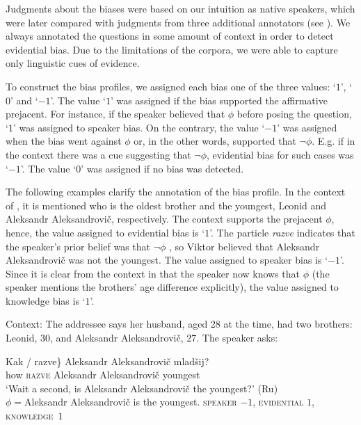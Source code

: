 \documentclass[output=paper,colorlinks,citecolor=brown]{langscibook}
\begin{document}
Judgments about the biases were based on our intuition as native speakers, which were later compared with judgments from three additional annotators (see ). We always annotated the questions in some amount of context in order to detect evidential bias. Due to the limitations of the corpora, we were able to capture only linguistic cues of evidence. 

To construct the bias profiles, we assigned each bias one of the three values: `$1$', `$0$' and `$-1$'. The value `$1$' was assigned if the bias supported the affirmative prejacent. For instance, if the speaker believed that $\phi$ before posing the question, `$1$' was assigned to speaker bias. On the contrary, the value `$-1$' was assigned when the bias went against $\phi$ or, in the other words, supported that $\neg \phi$. E.g. if in the context there was a cue suggesting that $\neg \phi$, evidential bias for such cases was `$-1$'. The value `$0$' was assigned if no bias was detected. 

The following examples clarify the annotation of the bias profile. In the context of , it is mentioned who is the oldest brother and the youngest, Leonid and Aleksandr Aleksandrovič, respectively. The context supports the prejacent $\phi$, hence, the value assigned to evidential bias is `$1$'. The particle \textit{razve} indicates that the speaker's prior belief was that $\neg \phi$ \citep{Geist2023, Korotkova2023}, so Viktor believed that Aleksandr Aleksandrovič was not the youngest. The value assigned to speaker bias is `$-1$'. Since it is clear from the context in  that the speaker now knows that $\phi$ (the speaker mentions the brothers' age difference explicitly), the value assigned to knowledge bias is `$1$'.

\largerpage
\begin{exe}
\ex Context: The addressee says her husband, aged 28 at the time, had two brothers: Leonid, 30, and Aleksandr Aleksandrovič, 27. The speaker asks:
    \begin{xlist}
     \gll \minsp{\{} Kak / razve\} Aleksandr Aleksandrovič mladšij? \\
    {} how {} \textsc{razve} Aleksandr Aleksandrovič youngest \\
    \glt `Wait a second, is Aleksandr Aleksandrovič the youngest?' \hfill (Ru)\\
    $\phi={}$Aleksandr Aleksandrovič is the youngest. 
    \label{ex-rubiases}
     \textsc{speaker} $-1$, \textsc{evidential} $1$, \textsc{knowledge}~$1$\hspace*{-1cm}
    \end{xlist}

\end{exe}
\end{document}

